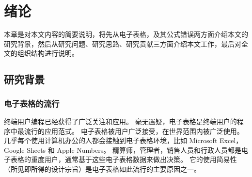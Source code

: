 \chapter{绪论}\label{introduction}

本章是对本文内容的简要说明，将先从电子表格，及其公式错误两方面介绍本文的研究背景，然后从研究问题、研究思路、研究贡献三方面介绍本文工作，最后对全文的组织结构进行说明。

\section{研究背景}

\subsection{电子表格的流行}

终端用户编程已经获得了广泛关注和应用。
毫无置疑，电子表格是终端用户的程序中最流行的应用范式。
电子表格被用户广泛接受，在世界范围内被广泛使用。
几乎每个使用计算机办公的人都会接触到电子表格环境，比如 Microsoft Excel，Google Sheets 和 Apple Numbers。
精算师，管理者，销售人员和行政人员都是电子表格的重度用户\cite{scaffidi2005estimating}，通常基于这些电子表格数据来做出决策。
它的使用简易性（所见即所得的设计宗旨）是电子表格如此流行的主要原因之一。





